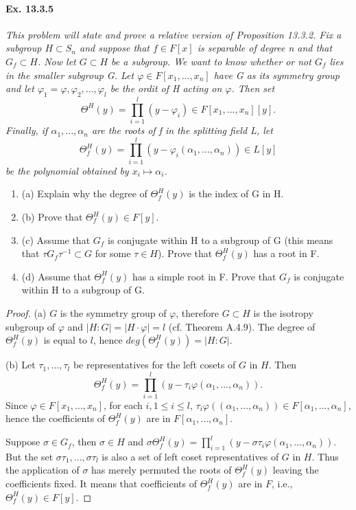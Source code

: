 \documentclass[11pt,a4paper]{article}
\newcommand{\be} {\begin{enumerate}}
\newcommand{\ee} {\end{enumerate}}
\begin{document}
\paragraph{Ex. 13.3.5}

{\it This problem will state and prove a relative version of Proposition 13.3.2. Fix a subgroup $H\subset S_n$ and suppose that $f\in F[x]$ is separable of degree n and that $G_f \subset H$. Now let $G \subset H$ be a subgroup. We want to know whether or not $G_f$ lies in the smaller subgroup G. Let $\varphi \in F[x_1,...,x_n]$ have G as its symmetry group and let $\varphi_1=\varphi,\varphi_2,...,\varphi_l$ be the ordit of H acting on $\varphi$. Then set $$\Theta^H(y)=\prod_{i=1}^l ( y - \varphi_i) \in F[x_1,...,x_n][y].$$ Finally, if $\alpha_1,...,\alpha_n$ are the roots of f in the splitting field L, let $$\Theta_f^H(y)=\prod_{i=1}^l ( y - \varphi_i(\alpha_1,...,\alpha_n))\in L[y]$$  be the polynomial obtained by $x_i \mapsto \alpha_i$.
\be
\item[(a)] Explain why the degree of $\Theta_f^H(y)$ is the index of G in H.
\item[(b)] Prove that $\Theta_f^H(y) \in F[y]$.
\item[(c)] Assume that $G_f$ is conjugate within H to a subgroup of G (this means that $\tau G_f \tau^{-1} \subset G$ for some $\tau \in H$). Prove that $\Theta_f^H(y)$ has a root in F.
\item[(d)] Assume that $\Theta_f^H(y)$ has a simple root in F. Prove that $G_f$ is conjugate within H to a subgroup of G.
\ee
\begin{proof}
\item[(a)] $G$ is the symmetry group of $\varphi$, therefore $G\subset H$ is the isotropy subgroup of $\varphi$ and $|H:G|=|H\cdot \varphi|=l$ (cf. Theorem A.4.9). The degree of $\Theta_f^H(y)$ is equal to $l$, hence $deg(\Theta_f^H(y))=|H:G|$. 
\item[(b)] Let $\tau_1,...,\tau_l$ be representatives for the left cosets of $G$ in $H$. Then $$\Theta_f^H(y)=\prod_{i=1}^l ( y - \tau_i\varphi(\alpha_1,...,\alpha_n)).$$ Since $\varphi \in F [x_1,...,x_n]$, for each $i, 1\leq i \leq l$, $\tau_i\varphi((\alpha_1,...,\alpha_n))\in F [\alpha_1,...,\alpha_n]  $, hence the coefficients of $\Theta_f^H(y)$ are in $F [\alpha_1,...,\alpha_n]  $.

Suppose $\sigma \in G_f$, then $\sigma \in H$ and $\sigma\Theta_f^H(y)=\prod_{i=1}^l ( y - \sigma\tau_i\varphi(\alpha_1,...,\alpha_n))$. But the set $\sigma\tau_1,...,\sigma\tau_l$ is also a set of left coset representatives of $G$ in $H$. Thus the application of $\sigma$ has merely permuted the roots of $\Theta_f^H(y)$ leaving the coefficients fixed. It means that coefficients of $\Theta_f^H(y)$ are in $F$, i.e., $\Theta_f^H(y) \in F[y]$. 


\end{proof}}
\end{document}
